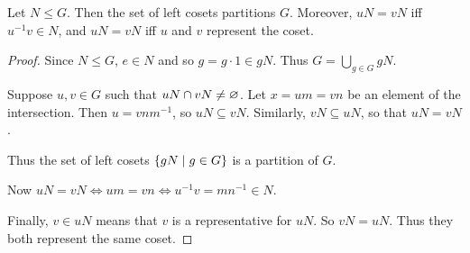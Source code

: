 \begin{proposition}
    Let $N \le G$.
    Then the set of left cosets partitions $G$.
    Moreover, $uN = vN$ iff $u^{-1}v \in N$,
    and $uN = vN$ iff $u$ and $v$ represent the coset.
\end{proposition}
\begin{proof}
    Since $N \le G$, $e \in N$ and so $g = g \cdot 1 \in g N$.
    Thus $G = \bigcup_{g \in G} gN$.

    Suppose $u, v \in G$ such that $uN \cap vN \ne \varnothing$.
    Let $x = um = vn$ be an element of the intersection.
    Then $u = vnm^{-1}$, so $uN \subseteq vN$.
    Similarly, $vN \subseteq uN$, so that $uN = vN$.

    Thus the set of left cosets $\set{gN \mid g \in G}$ is a partition of
    $G$.

    Now $uN = vN \iff um = vn \iff u^{-1}v = mn^{-1} \in N$.

    Finally, $v \in uN$ means that $v$ is a representative for $uN$.
    So $vN = uN$.
    Thus they both represent the same coset.
\end{proof}

